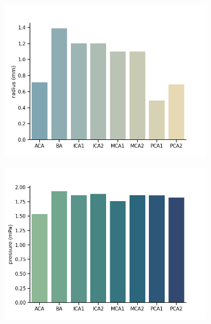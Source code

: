 \documentclass[fleqn,10pt]{wlscirep}
\begin{document}
\begin{figure}
    \centering
    \begin{subfigure}[b]{0.33\textwidth}
    \centering
    \includegraphics[width = \linewidth]{figures/arteries_labels_radius.png}
    \end{subfigure}
     \begin{subfigure}[b]{0.33\textwidth}
    \centering
    \includegraphics[width =  \linewidth]{figures/arteries_labels_pressure.png}
    \end{subfigure}
     \begin{subfigure}[b]{0.33\textwidth}
    \centering

\end{subfigure}
\end{figure}
\end{document}
